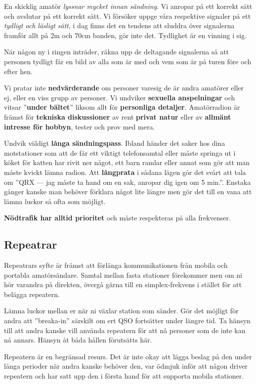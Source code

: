En skicklig amatör \textit{lyssnar mycket innan sändning}. Vi anropar på ett korrekt sätt och avslutar på ett korrekt sätt. Vi försöker uppge våra respektive signaler på ett \emph{tydligt och läsligt sätt}, i dag finns det en tendens att sluddra över signalerna framför allt på 2m och 70cm banden, gör inte det. Tydlighet är en vinning i sig. 

När någon ny i ringen inträder, räkna upp de deltagande signalerna så att personen tydligt får en bild av alla som är med och vem som är på turen före och efter hen.

Vi pratar inte \textbf{nedvärderande} om personer varesig de är andra amatörer eller ej, eller en viss grupp av personer. Vi undviker \textbf{sexuella anspelningar} och vitsar ''\textbf{under bältet}'' liksom allt för \textbf{personliga detaljer}. Amatörradion är främst för \textbf{tekniska diskussioner} av rent \textbf{privat natur} eller av \textbf{allmänt intresse för hobbyn}, tester och prov med mera.

Undvik väldigt \textbf{långa sändningspass}. Ibland händer det saker hos dina motstationer som att de får ett viktigt telefonsamtal eller måste springa ut i köket för katten har rivit ner något, ett barn ramlar eller annat som gör att man måste kvickt lämna radion. Att \textbf{långprata} i sådana lägen gör det svårt att tala om ''QRX --- jag måste ta hand om en sak, anropar dig igen om 5 min.''. Enstaka gånger kanske man behöver förklara något lite längre men gör det till en vana att lämna luckor så ofta som möjligt.

\textbf{Nödtrafik har alltid prioritet} och måste respekteras på alla
frekvenser.

\subsection{Repeatrar}

Repeatrars syfte är främst att förlänga kommunikationen från mobila och portabla amatörsändare. Samtal mellan fasta stationer förekommer men om ni hör varandra på direkten, övergå gärna till en simplex-frekvens i stället för att belägga repeatern.

Lämna luckor mellan er när ni växlar station som sänder. Gör det möjligt för andra att ''breaka-in'' särskilt om ert QSO fortsätter under längre tid. Ta hänsyn till att andra kanske vill använda repeatern för att nå personer som de inte kan nå annars. Hänsyn åt båda hållen förutsätts här. 

Repeatern är en begränsad resurs. Det är inte okay att lägga beslag på den under långa perioder när andra kanske behöver den, var ödmjuk inför att någon driver repeatern och har satt upp den i första hand för att supporta mobila stationer.


